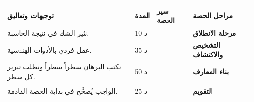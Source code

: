 \documentclass[12pt,a4paper]{article}
\newenvironment{LTR}{\begin{otherlanguage}{english}}{\end{otherlanguage}}
\newcommand{\ar}[1]{\foreignlanguage{arabic}{#1}}
\renewcommand{\ldots}{\mathinner{\ldotp\ldotp\ldotp}}
\newcommand{\Q}{\mathbb{Q}}
\newcommand{\bx}[1]{\ensuremath{\colorbox{cDef!12}{$\displaystyle #1$}}}
\newcommand{\Phase}[1]{\textbf{#1}}
\newenvironment{Sayr}{%
\begin{LTR}\renewcommand{\arraystretch}{1.25}
\begin{longtable}{|p{0.17\textwidth}|>{\centering\arraybackslash}p{0.06\textwidth}|p{0.53\textwidth}|>{\centering\arraybackslash}p{0.12\textwidth}|}
\hline\rowcolor{cThm!12}\ar{\textbf{توجيهات وتعاليق}} & \ar{\textbf{المدة}} & \ar{\textbf{سير الحصة}} & \ar{\textbf{مراحل الحصة}}\\\hline\endhead
\hline\endfoot}{\end{longtable}\end{LTR}}
\newcommand{\Row}[4]{\ar{\small #4} & \ar{#3} & \ar{#2} & \cellcolor{cThm!8}\ar{\Phase{#1}}\\\hline}
\newcommand{\Lab}[2]{\foreignlanguage{english}{\tcbox[on line,colback=#1,colframe=#1,boxrule=0pt,arc=2pt,boxsep=1pt,left=5pt,right=5pt,top=1pt,bottom=1pt]{\ar{\textcolor{white}{\textbf{#2}}}}}}
\newcommand{\Num}[1]{\foreignlanguage{english}{\tikz[baseline=(c.base)]\node[fill=cDef,text=white,inner sep=2pt,font=\footnotesize\bfseries](c){#1};}}
\newcommand{\ck}{\ensuremath{{\color{cRem}\checkmark}}}
\begin{document}
\begin{Sayr}
\Row{مرحلة الانطلاق}{%
\textbf{التهيئة النفسية:} التذكير بمبرهنة فيثاغورس.\par\Num{1} الحاسبة تعطي $\sqrt2\approx1{,}414213562$ ، فهل $\sqrt2=\dfrac{1414213562}{10^9}$ ؟ \ \Num{2} احسب $(1{,}414213562)^2$ بالحاسبة.}{10 د}{نثير الشك في نتيجة الحاسبة.}
\Row{التشخيص والاكتشاف}{%
\Lab{cEx}{مناقشة النشاطين 02 و 03 صفحة 2}\par\ck\ قطر مربع ضلعه $1$ طوله $\sqrt{1^2+1^2}=\sqrt2$.\par
\ck\ وتر مثلث قائم ضلعاه $1$ و $2$ طوله $\sqrt5$ ؛ وبتكرار البناء نحصل على $\sqrt3$ ، $\sqrt4$ ، $\sqrt5$ ، $\ldots$ (\textbf{حلزون فيثاغورس}).\par
\ck\ بمبرهنة طالس نقسم قطعة إلى $3$ أجزاء متقايسة فنحصل على الطول $\dfrac23$.\par
\ck\ كل هذه الأعداد \textbf{قابلة للإنشاء} ؛ هل هي ناطقة؟\par
}{35 د}{عمل فردي بالأدوات الهندسية.}
\Row{بناء المعارف}{%
\Lab{cThm}{تمهيدية}\ إذا كان $p^2$ زوجياً فإن $p$ زوجي. (لأنه إذا كان $p=2k+1$ فإن $p^2=2(2k^2+2k)+1$ فردي.)\par\Lab{cMeth}{البرهان بالخلف}\ لنبرهن أن خاصية صحيحة ، نفرض أنها خاطئة ونصل إلى تناقض.\par}{50 د}{نكتب البرهان سطراً سطراً ونطلب تبرير كل سطر.}
\Row{}{%
\Lab{cThm}{خاصية}\ \bx{\sqrt2\notin\Q}.\par\textbf{البرهان:} نفرض $\sqrt2=\dfrac pq$ كسراً غير قابل للاختزال. إذن $p^2=2q^2$ ، فـ $p^2$ زوجي ومنه $p$ زوجي: $p=2k$. نعوّض: $4k^2=2q^2$ أي $q^2=2k^2$ ، فـ $q$ زوجي أيضاً. إذن $2$ يقسم $p$ و $q$ ، وهذا يناقض أن الكسر غير قابل للاختزال.\par\Lab{cRem}{ملاحظات}\par\ck\ العدد $\sqrt2$ \textbf{أصم} ، والعدد $1{,}414213562$ قيمة مقربة له فقط: مربعه لا يساوي $2$ تماماً.\par
\ck\ العدد القابل للإنشاء ليس بالضرورة ناطقاً.\par
}{}{}
\Row{التقويم}{%
\Lab{cEx}{تطبيق}\par\Num{1} برهن بالخلف أن $1+\sqrt2\notin\Q$. \ \Num{2} أنشئ قطعة طولها $\sqrt{10}$.\par\textbf{الحل:} \Num{1} لو كان $1+\sqrt2=r\in\Q$ لكان $\sqrt2=r-1\in\Q$: تناقض. \ \Num{2} وتر مثلث قائم ضلعاه $1$ و $3$.\par\textbf{واجب منزلي:} برهن أن $\sqrt3\notin\Q$ (اكتب $p=3k$ أو $p=3k+1$ أو $p=3k+2$).\par\smallskip\textbf{ملاحظات حول سير الحصة:} \dotfill}{25 د}{الواجب يُصحَّح في بداية الحصة القادمة.}
\end{Sayr}
\end{document}
